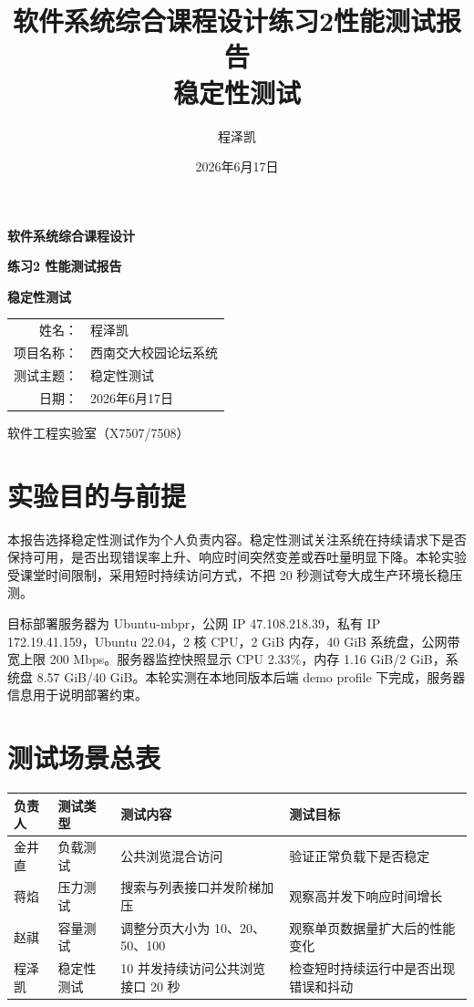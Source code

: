 \documentclass[UTF8,a4paper,12pt]{ctexart}
\title{软件系统综合课程设计练习2性能测试报告\\稳定性测试}
\author{程泽凯}
\date{2026年6月17日}
\begin{document}
\begin{titlepage}
\centering
\vspace*{2.2cm}
{\bfseries 软件系统综合课程设计\par}
\vspace{0.5cm}
{\bfseries 练习2 性能测试报告\par}
\vspace{1.1cm}
{\bfseries 稳定性测试\par}
\vfill
\begin{tabular}{rl}
姓名： & 程泽凯\\[0.4cm]
项目名称： & 西南交大校园论坛系统\\[0.4cm]
测试主题： & 稳定性测试\\[0.4cm]
日期： & 2026年6月17日
\end{tabular}
\vfill
{\large 软件工程实验室（X7507/7508）\par}
\end{titlepage}
\setcounter{page}{1}

\section{实验目的与前提}
本报告选择稳定性测试作为个人负责内容。稳定性测试关注系统在持续请求下是否保持可用，是否出现错误率上升、响应时间突然变差或吞吐量明显下降。本轮实验受课堂时间限制，采用短时持续访问方式，不把 20 秒测试夸大成生产环境长稳压测。

目标部署服务器为 Ubuntu-mbpr，公网 IP 47.108.218.39，私有 IP 172.19.41.159，Ubuntu 22.04，2 核 CPU，2 GiB 内存，40 GiB 系统盘，公网带宽上限 200 Mbps。服务器监控快照显示 CPU 2.33\%，内存 1.16 GiB/2 GiB，系统盘 8.57 GiB/40 GiB。本轮实测在本地同版本后端 demo profile 下完成，服务器信息用于说明部署约束。

\section{测试场景总表}
\begin{longtable}{P{2.3cm}P{2.4cm}P{5.0cm}P{4.5cm}}
\toprule
负责人 & 测试类型 & 测试内容 & 测试目标\\
\midrule
金井直 & 负载测试 & 公共浏览混合访问 & 验证正常负载下是否稳定\\
蒋焰 & 压力测试 & 搜索与列表接口并发阶梯加压 & 观察高并发下响应时间增长\\
赵祺 & 容量测试 & 调整分页大小为 10、20、50、100 & 观察单页数据量扩大后的性能变化\\
程泽凯 & 稳定性测试 & 10 并发持续访问公共浏览接口 20 秒 & 检查短时持续运行中是否出现错误和抖动\\
\bottomrule
\end{longtable}
\end{document}
